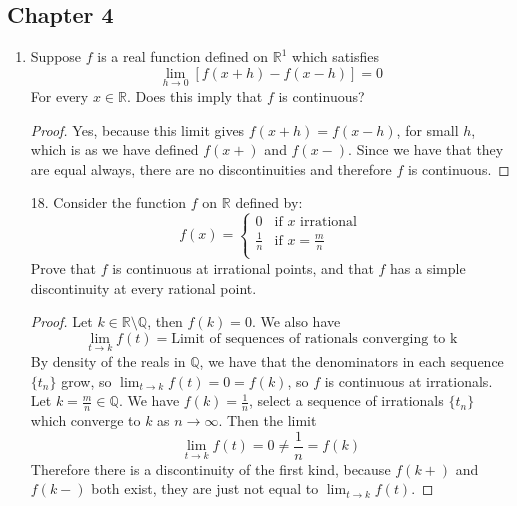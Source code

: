 \documentclass[hidelinks,12pt]{article}
\newcommand{\R}{\mathbb{R}}
\newcommand{\Q}{\mathbb{Q}}
\begin{document}
\subsection*{Chapter 4}
\begin{enumerate}
    \item Suppose \(f\) is a real function defined on \(\R^{1}\) which satisfies \[
            \lim_{h\to0}\left[f(x+h)-f(x-h)\right]=0
    \]
   For every \(x\in\R\). Does this imply that \(f\) is continuous? 
   \begin{proof}
   Yes, because this limit gives \(f(x+h)=f(x-h)\), for small \(h\), which is as we have defined \(f(x+)\) and \(f(x-)\). Since we have that they are equal always, there are no discontinuities and therefore \(f\) is continuous.
   \end{proof}
    \item[18.] Consider the function \(f\) on \(\R\) defined by: \[
    f(x)=\begin{cases}
    0 & \text{if }x\text{ irrational}\\
    \frac{1}{n} & \text{if }x=\frac{m}{n}\\
    \end{cases}
    \]
    Prove that \(f\) is continuous at irrational points, and that \(f\) has a simple discontinuity at every rational point.
    \begin{proof}
        Let \(k\in\R\setminus\Q\), then \(f(k)=0\). We also have
        \[
            \lim_{t\to k}f(t)=\text{Limit of sequences of rationals converging to k}
        \]
        By density of the reals in \(\Q\), we have that the denominators in each sequence \(\{t_{n}\}\) grow, so \(\lim_{t\to k}f(t)=0=f(k)\), so \(f\) is continuous at irrationals.\\
        Let \(k=\frac{m}{n}\in\Q\). We have \(f(k)=\frac{1}{n}\), select a sequence of irrationals \(\{t_{n}\}\) which converge to \(k\) as \(n\to\infty\). Then the limit
        \[
            \lim_{t\to k}f(t)=0\neq \frac{1}{n}=f(k)
        \]
        Therefore there is a discontinuity of the first kind, because \(f(k+)\) and \(f(k-)\) both exist, they are just not equal to \(\lim_{t\to k}f(t)\).
    \end{proof}
\end{enumerate}
\end{document}
